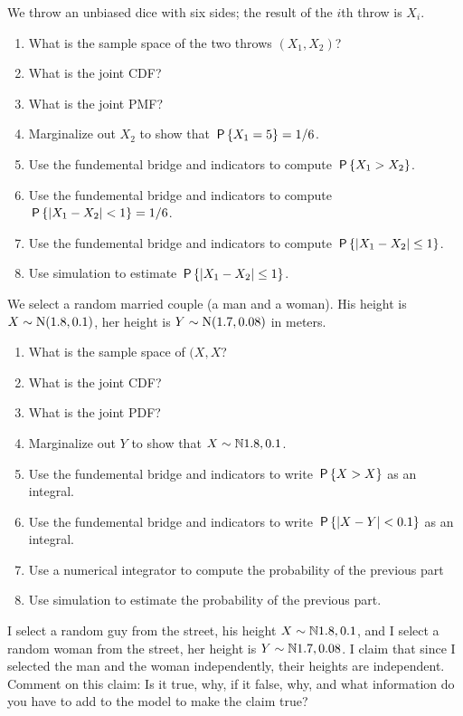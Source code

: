 \documentclass[a4paper]{article}
\begin{document}
\begin{exercise}
We throw an unbiased dice with six sides; the result of the $i$th throw is $X_i$. 
\begin{enumerate}
\item What is the sample space of the two throws $(X_{1}, X_2)$?
\item What is the joint CDF?
\item What is the joint PMF?
\item  Marginalize out $X_2$ to show that $\P{X_1=5} = 1/6$.
\item Use the fundemental bridge and indicators to compute $\P{X_1>X_2}$.
\item Use the fundemental bridge and indicators to compute $\P{|X_1-X_2| < 1 } = 1/6$.
\item Use the fundemental bridge and indicators to compute $\P{|X_1-X_2|\leq 1 }$.
\item Use simulation to estimate  $\P{|X_1-X_2|\leq 1 }$.
\end{enumerate}
\end{exercise}

\begin{exercise}
We select a random married couple (a man and a woman). His height is $X\sim \Norm{1.8, 0.1}$, her height is $Y\sim \Norm{1.7, 0.08}$ in meters. 
\begin{enumerate}
\item What is the sample space of $(X, X$?
\item What is the joint CDF?
\item What is the joint PDF?
\item  Marginalize out $Y$ to show that $X\sim \N{1.8, 0.1}$.
\item Use the fundemental bridge and indicators to write  $\P{X>X}$ as an integral.
\item Use the fundemental bridge and indicators to write  $\P{|X-Y| < 0.1 }$ as an integral.
\item Use a numerical integrator to compute the probability of the previous part
\item Use simulation to estimate the probability of the previous part.
\end{enumerate}
\end{exercise}

\begin{exercise}
I select a random guy from the street, his height $X\sim\N{1.8, 0.1}$, and I select a random woman from the street, her height is $Y\sim\N{1.7, 0.08}$.
I claim that since I selected the man and the woman independently, their heights are independent.
Comment on this claim: Is it true, why, if it false, why, and what information do you have to add to the model to make the claim true?
\end{exercise}
\end{document}
